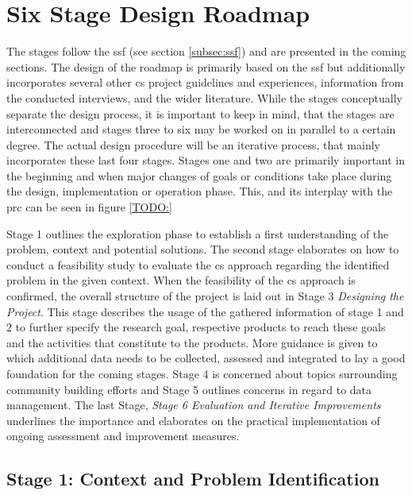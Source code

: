 \section{Six Stage Design Roadmap}\label{sec:ssdr}
The stages follow the \acrlong{ssf} (see section \ref*{subsec:ssf}) and are presented in the coming sections. The design of the roadmap is primarily based on the \acrshort{ssf} but additionally incorporates several other \acrshort{cs} project guidelines and experiences, information from the conducted interviews, and the wider literature. While the stages conceptually separate the design process, it is important to keep in mind, that the stages are interconnected and stages three to six may be worked on in parallel to a certain degree. The actual design procedure will be an iterative process, that mainly incorporates these last four stages. Stages one and two are primarily important in the beginning and when major changes of goals or conditions take place during the design, implementation or operation phase. This, and its interplay with the \acrshort{prc} can be seen in figure \ref{TODO:}\newline


Stage 1 outlines the exploration phase to establish a first understanding of the problem, context and potential solutions. The second stage elaborates on how to conduct a feasibility study to evaluate the \acrshort{cs} approach regarding the identified problem in the given context. When the feasibility of the \acrshort{cs} approach is confirmed, the overall structure of the project is laid out in Stage 3 \textit{Designing the Project}. This stage describes the usage of the gathered information of stage 1 and 2 to further specify the research goal, respective products to reach these goals and the activities that constitute to the products. More guidance is given to which additional data needs to be collected, assessed and integrated to lay a good foundation for the coming stages. Stage 4 is concerned about topics surrounding community building efforts and Stage 5 outlines concerns in regard to data management. The last Stage, \textit{Stage 6 Evaluation and Iterative Improvements} underlines the importance and elaborates on the practical implementation of ongoing assessment and improvement measures.

\subsection{Stage 1: Context and Problem Identification}\label{subsec:stage1_design}

